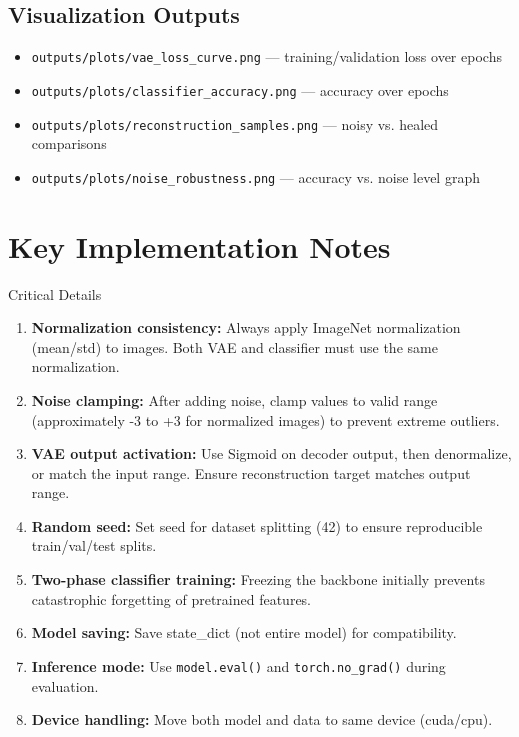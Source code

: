 \documentclass[11pt,a4paper]{article}
\begin{document}
\subsection{Visualization Outputs}
\begin{itemize}[noitemsep]
    \item \texttt{outputs/plots/vae\_loss\_curve.png} --- training/validation loss over epochs
    \item \texttt{outputs/plots/classifier\_accuracy.png} --- accuracy over epochs
    \item \texttt{outputs/plots/reconstruction\_samples.png} --- noisy vs. healed comparisons
    \item \texttt{outputs/plots/noise\_robustness.png} --- accuracy vs. noise level graph
\end{itemize}

\newpage


\section{Key Implementation Notes}

\begin{conceptbox}{Critical Details}
\begin{enumerate}
    \item \textbf{Normalization consistency:} Always apply ImageNet normalization (mean/std) to images. Both VAE and classifier must use the same normalization.

    \item \textbf{Noise clamping:} After adding noise, clamp values to valid range (approximately -3 to +3 for normalized images) to prevent extreme outliers.

    \item \textbf{VAE output activation:} Use Sigmoid on decoder output, then denormalize, or match the input range. Ensure reconstruction target matches output range.

    \item \textbf{Random seed:} Set seed for dataset splitting (42) to ensure reproducible train/val/test splits.

    \item \textbf{Two-phase classifier training:} Freezing the backbone initially prevents catastrophic forgetting of pretrained features.

    \item \textbf{Model saving:} Save state\_dict (not entire model) for compatibility.

    \item \textbf{Inference mode:} Use \texttt{model.eval()} and \texttt{torch.no\_grad()} during evaluation.

    \item \textbf{Device handling:} Move both model and data to same device (cuda/cpu).
\end{enumerate}
\end{conceptbox}
\end{document}
